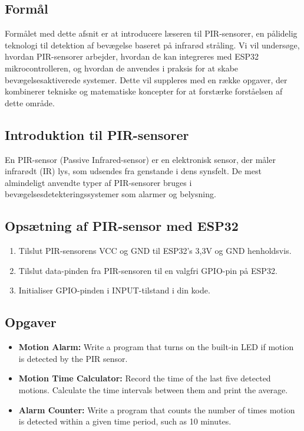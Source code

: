 \subsection*{Formål}
Formålet med dette afsnit er at introducere læseren til PIR-sensorer, en pålidelig teknologi til detektion af bevægelse baseret på infrarød stråling. Vi vil undersøge, hvordan PIR-sensorer arbejder, hvordan de kan integreres med ESP32 mikrocontrolleren, og hvordan de anvendes i praksis for at skabe bevægelsesaktiverede systemer. Dette vil suppleres med en række opgaver, der kombinerer tekniske og matematiske koncepter for at forstærke forståelsen af dette område.

\subsection*{Introduktion til PIR-sensorer}
En PIR-sensor (Passive Infrared-sensor) er en elektronisk sensor, der måler infrarødt (IR) lys, som udsendes fra genstande i dens synsfelt. De mest almindeligt anvendte typer af PIR-sensorer bruges i bevægelsesdetekteringssystemer som alarmer og belysning.

\subsection*{Opsætning af PIR-sensor med ESP32}
\begin{enumerate}
	\item Tilslut PIR-sensorens VCC og GND til ESP32's 3,3V og GND henholdsvis.
	\item Tilslut data-pinden fra PIR-sensoren til en valgfri GPIO-pin på ESP32.
	\item Initialiser GPIO-pinden i INPUT-tilstand i din kode.
\end{enumerate}

\subsection*{Opgaver}
\begin{itemize}
	\item \textbf{Motion Alarm:} Write a program that turns on the built-in LED if motion is detected by the PIR sensor.
	\item \textbf{Motion Time Calculator:} Record the time of the last five detected motions. Calculate the time intervals between them and print the average.
	\item \textbf{Alarm Counter:} Write a program that counts the number of times motion is detected within a given time period, such as 10 minutes.
\end{itemize}

